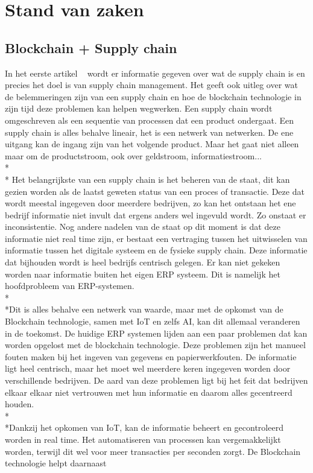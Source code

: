 \chapter{Stand van zaken}
\label{ch:stand-van-zaken}



\section{Blockchain + Supply chain}
In het eerste artikel ~\autocite{supchain1} wordt er informatie gegeven over wat de supply chain is en precies het doel is van supply chain management. Het geeft ook uitleg over wat de belemmeringen zijn van een supply chain en hoe de blockchain technologie in zijn tijd deze problemen kan helpen wegwerken. Een supply chain wordt omgeschreven als een sequentie van processen dat een product ondergaat. Een supply chain is alles behalve lineair, het is een netwerk van netwerken. De ene uitgang kan de ingang zijn van het volgende product. Maar het gaat niet alleen maar om de productstroom, ook over geldstroom, informatiestroom...\\*\\* Het belangrijkste van een supply chain is het beheren van de staat, dit kan gezien worden als de laatst geweten status van een proces of transactie. Deze dat wordt meestal ingegeven door meerdere bedrijven, zo kan het ontstaan het ene bedrijf informatie niet invult dat ergens anders wel ingevuld wordt. Zo onstaat er inconsistentie. Nog andere nadelen van de staat op dit moment is dat deze informatie niet real time zijn, er bestaat een vertraging tussen het uitwisselen van informatie tussen het digitale systeem en de fysieke supply chain. Deze informatie dat bijhouden wordt is heel bedrijfs centrisch gelegen. Er kan niet gekeken worden naar informatie buiten het eigen ERP systeem. Dit is namelijk het hoofdprobleem van ERP-systemen.\\*\\*Dit is alles behalve een netwerk van waarde, maar met de opkomst van de Blockchain technologie, samen met IoT en zelfs AI, kan dit allemaal veranderen in de toekomst. De huidige ERP systemen lijden aan een paar problemen dat kan worden opgelost met de blockchain technologie. Deze problemen zijn het manueel fouten maken bij het ingeven van gegevens en papierwerkfouten. De informatie ligt heel centrisch, maar het moet wel meerdere keren ingegeven worden door verschillende bedrijven. De aard van deze problemen ligt bij het feit dat bedrijven elkaar elkaar niet vertrouwen met hun informatie en daarom alles gecentreerd houden.\\*\\*Dankzij het opkomen van IoT, kan de informatie beheert en gecontroleerd worden in real time. Het automatiseren van processen kan vergemakkelijkt worden, terwijl dit wel voor meer transacties per seconden zorgt. De Blockchain technologie helpt daarnaast 